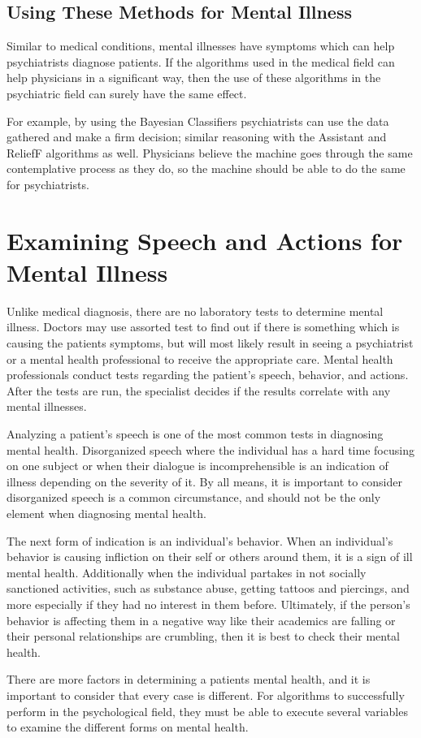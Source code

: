 \documentclass[11pt,technote,twocolumn]{IEEEtran}
\begin{document}
\subsection{Using These Methods for Mental Illness}
Similar to medical conditions, mental illnesses have symptoms which can help psychiatrists diagnose patients. If the algorithms used in the medical field can help physicians in a significant way, then the use of these algorithms in the psychiatric field can surely have the same effect.
\par
For example, by using the Bayesian Classifiers psychiatrists can use the data gathered and make a firm decision; similar reasoning with the Assistant and ReliefF algorithms as well. Physicians believe the machine goes through the same contemplative process as they do, so the machine should be able to do the same for psychiatrists.
\section{Examining Speech and Actions for Mental Illness}
Unlike medical diagnosis, there are no laboratory tests to determine mental illness. Doctors may use assorted test to find out if there is something which is causing the patients symptoms, but will most likely result in seeing a psychiatrist or a mental health professional to receive the appropriate care. Mental health professionals conduct tests regarding the patient's speech, behavior, and actions. After the tests are run, the specialist decides if the results correlate with any mental illnesses.
\par
Analyzing a patient's speech is one of the most common tests in diagnosing mental health. Disorganized speech where the individual has a hard time focusing on one subject or when their dialogue is incomprehensible is an indication of illness depending on the severity of it. By all means, it is important to consider disorganized speech is a common circumstance, and should not be the only element when diagnosing mental health.
\par
The next form of indication is an individual's behavior. When an individual's behavior is causing infliction on their self or others around them, it is a sign of ill mental health. Additionally when the individual partakes in not socially sanctioned activities, such as substance abuse, getting tattoos and piercings, and more especially if they had no interest in them before. Ultimately, if the person's behavior is affecting them in a negative way like their academics are falling or their personal relationships are crumbling, then it is best to check their mental health.
\par
There are more factors in determining a patients mental health, and it is important to consider that every case is different. For algorithms to successfully perform in the psychological field, they must be able to execute several variables to examine the different forms on mental health. 
\end{document}
